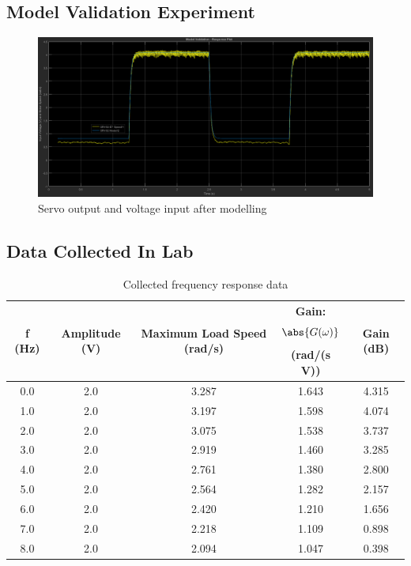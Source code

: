 \subsection{Model Validation Experiment}
  \begin{figure}[htb]
    \centering
    \includegraphics[scale=0.35]{figures/model.png}
    \caption{Servo output and voltage input after modelling}
    \label{fig:model}
  \end{figure}

  \subsection{Data Collected In Lab}
  \begin{table}
  \centering
  \caption{Collected frequency response data}
  \label{tab1.1}
  \begin{tabular}{ | c | c | c | c | c | }
  \hline
  f (Hz) & Amplitude (V) & Maximum Load Speed (rad/s) & Gain: $$\abs{G(\omega)}$$ (rad/(s V)) & Gain (dB)\\
  \hline
  0.0 & 2.0 & 3.287 & 1.643 &	4.315\\
  1.0 & 2.0 & 3.197 &	1.598 &	4.074\\
  2.0 & 2.0 & 3.075 &	1.538 &	3.737\\
  3.0 & 2.0 & 2.919 &	1.460 &	3.285\\
  4.0 & 2.0 & 2.761 &	1.380 &	2.800\\
  5.0 & 2.0 & 2.564 &	1.282 &	2.157\\
  6.0 & 2.0 & 2.420 &	1.210 &	1.656\\
  7.0 & 2.0 & 2.218 &	1.109 &	0.898\\
  8.0 & 2.0 & 2.094 &	1.047 &	0.398\\
  \hline
  \end{tabular}
  \end{table}
  
